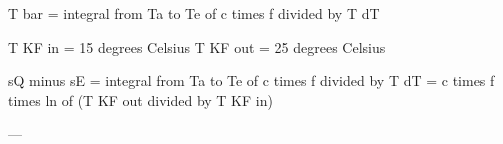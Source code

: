 T bar = integral from Ta to Te of c times f divided by T dT  

T KF in = 15 degrees Celsius  
T KF out = 25 degrees Celsius  

sQ minus sE = integral from Ta to Te of c times f divided by T dT = c times f times ln of (T KF out divided by T KF in)  

---